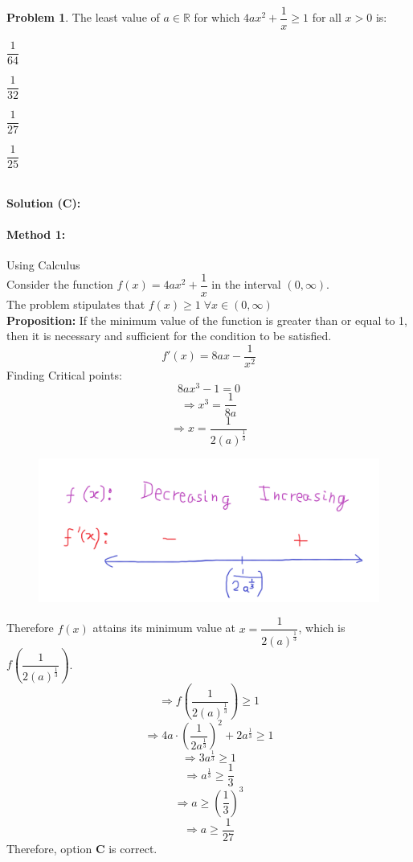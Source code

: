 \documentclass[14]{article}
\theoremstyle{definition}
\newtheorem{prob}{Problem}
\theoremstyle{case}
\begin{document}
\pagebreak
\begin{prob}
The least value of $a \in \mathbb{R}$ for which $4ax^2 + \dfrac1{x} \geq 1$ for all $x > 0$ is:\\
\begin{enumerate*}[label=(\Alph*)]
\item $\dfrac1{64}\quad\quad$
\item $\dfrac1{32}\quad\quad$
\item $\dfrac1{27}\quad\quad$
\item $\dfrac1{25}$\\
\end{enumerate*}\\
\textbf{Solution (C):}
\paragraph{Method 1:} Using Calculus\\
Consider the function $f(x) = 4ax^2 + \dfrac1{x}$ in the interval $(0, \infty)$.\\
The problem stipulates that $f(x) \geq 1 \; \forall x \in (0, \infty)$\\
\textbf{Proposition:} If the minimum value of the function is greater than or equal to 1, then it is necessary and sufficient for the condition to be satisfied.
\[f'(x) = 8ax - \dfrac1{x^2}\]
Finding Critical points:
\[8 ax^3 - 1 = 0\]
\[\Rightarrow x^3 = \dfrac1{8a}\]
\[\Rightarrow x = \dfrac1{2(a)^{\frac13}}\]
\begin{figure}[h]
\includegraphics[scale=0.25]{images/prob41}
\end{figure}
Therefore $f(x)$ attains its minimum value at $x = \dfrac1{2(a)^{\frac13}}$, which is $f\left(\dfrac1{2(a)^{\frac13}}\right)$.
\[\Rightarrow f\left(\dfrac1{2(a)^{\frac13}}\right) \geq 1\]
\[\Rightarrow 4a\cdot \left( \dfrac1{2a^{\frac13}}\right)^2 + 2a^{\frac13}\geq 1\]
\[\Rightarrow 3a^{\frac13} \geq 1\]
\[\Rightarrow a^{\frac13} \geq \dfrac1{3}\]
\[\Rightarrow a \geq \left(\dfrac13\right)^3\]
\[\Rightarrow a \geq \dfrac1{27}\]
Therefore, option \textbf{C} is correct.
\pagebreak

\end{prob}
\end{document}
